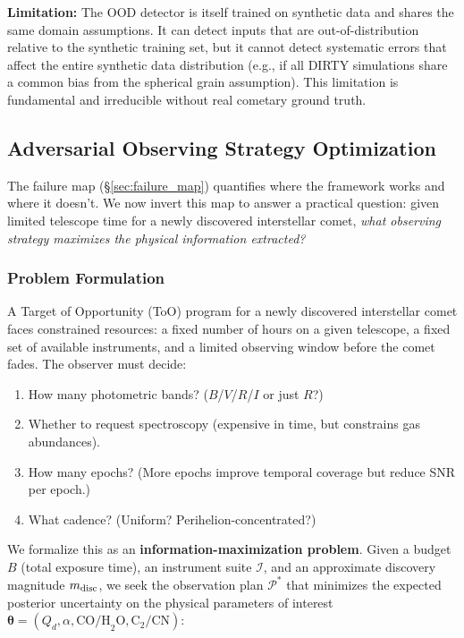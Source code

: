 \documentclass[usenatbib]{mnras}
\begin{document}
\textbf{Limitation:} The OOD detector is itself trained on synthetic data and shares the same domain assumptions. It can detect inputs that are out-of-distribution relative to the synthetic training set, but it cannot detect systematic errors that affect the entire synthetic data distribution (e.g., if all DIRTY simulations share a common bias from the spherical grain assumption). This limitation is fundamental and irreducible without real cometary ground truth.

\subsection{Adversarial Observing Strategy Optimization}\label{sec:obsopt}

The failure map (\S\ref{sec:failure_map}) quantifies where the framework works and where it doesn't. We now invert this map to answer a practical question: given limited telescope time for a newly discovered interstellar comet, \textit{what observing strategy maximizes the physical information extracted?}

\subsubsection{Problem Formulation}

A Target of Opportunity (ToO) program for a newly discovered interstellar comet faces constrained resources: a fixed number of hours on a given telescope, a fixed set of available instruments, and a limited observing window before the comet fades. The observer must decide:
\begin{enumerate}
    \item How many photometric bands? ($B$/$V$/$R$/$I$ or just $R$?)
    \item Whether to request spectroscopy (expensive in time, but constrains gas abundances).
    \item How many epochs? (More epochs improve temporal coverage but reduce SNR per epoch.)
    \item What cadence? (Uniform? Perihelion-concentrated?)
\end{enumerate}

We formalize this as an \textbf{information-maximization problem}. Given a budget $B$ (total exposure time), an instrument suite $\mathcal{I}$, and an approximate discovery magnitude $m_{\rm disc}$, we seek the observation plan $\mathcal{P}^*$ that minimizes the expected posterior uncertainty on the physical parameters of interest $\boldsymbol{\theta} = (Q_d, \alpha, \text{CO/H}_2\text{O}, \text{C}_2/\text{CN})$:
\end{document}
